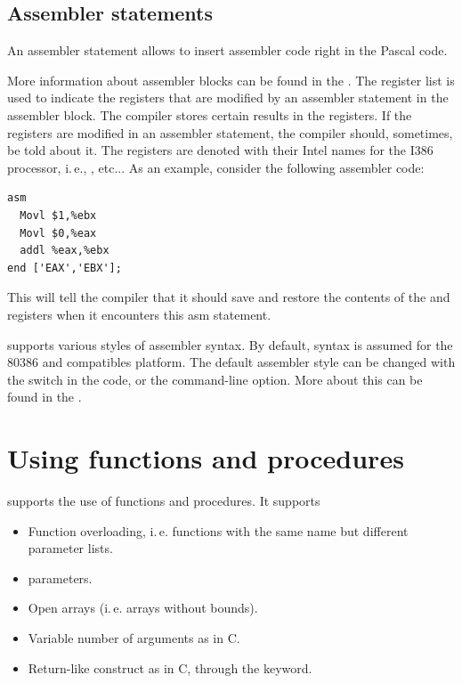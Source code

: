 \section{Assembler statements}
An assembler statement allows to insert assembler code right in the
Pascal code.

More information about assembler blocks can be found in the \progref.
The register list is used to indicate the registers that are modified by an
assembler statement in the assembler block. The compiler stores certain results in the
registers. If the registers are modified in an assembler statement, the compiler
should, sometimes, be told about it. The registers are denoted with their
Intel names for the I386 processor, i.\,e., ,  etc...
As an example, consider the following assembler code:
\begin{verbatim}
asm
  Movl $1,%ebx
  Movl $0,%eax
  addl %eax,%ebx
end ['EAX','EBX'];
\end{verbatim}
This will tell the compiler that it should save and restore the contents of
the  and  registers when it encounters this asm statement.

\fpc supports various styles of assembler syntax. By default, 
syntax is assumed for the 80386 and compatibles platform.
The default assembler style can be changed with the 
switch in the code, or the  command-line option. More about this can
be found in the \progref.


\chapter{Using functions and procedures}
\label{ch:Procedures}
\fpc supports the use of functions and procedures. It supports
\begin{itemize}
\item Function overloading, i.\,e. functions with the same name but different
parameter lists.
\item {} parameters.
\item Open arrays (i.\,e. arrays without bounds).
\item Variable number of arguments as in C.
\item Return-like construct as in C, through the  keyword.
\end{itemize}

